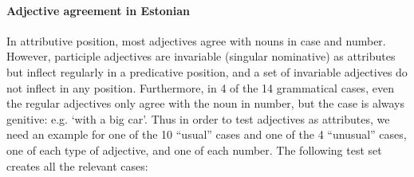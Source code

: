 \documentclass[11pt]{article}
\begin{document}
\paragraph{Adjective agreement in Estonian} In attributive position, most adjectives agree with nouns in case and number. However, participle adjectives are invariable (singular nominative) as attributes but inflect regularly in a predicative position, and a set of invariable adjectives do not inflect in any position. Furthermore, in 4 of the 14 grammatical cases, even the regular adjectives only agree with the noun in number, but the case is always genitive: e.g.
`with a big car'. 
Thus in order to test adjectives as attributes, we need an example for one of the 10 ``usual'' cases and one of the 4 ``unusual'' cases, one of each type of adjective, and one of each number. 
The following test set creates all the relevant cases:
\end{document}
